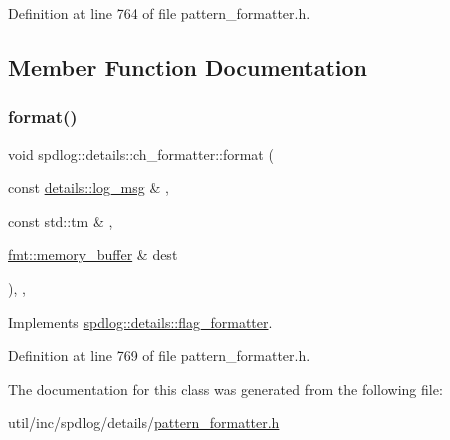 Definition at line 764 of file pattern\+\_\+formatter.\+h.



\subsection{Member Function Documentation}
\mbox{\label{classspdlog_1_1details_1_1ch__formatter_a11cf092c89041ff6186efb4324227cdb}} 
\subsubsection{\texorpdfstring{format()}{format()}}
{\footnotesize\ttfamily void spdlog\+::details\+::ch\+\_\+formatter\+::format (\begin{DoxyParamCaption}\item[{const \hyperlink{structspdlog_1_1details_1_1log__msg}{details\+::log\+\_\+msg} \&}]{,  }\item[{const std\+::tm \&}]{,  }\item[{\hyperlink{format_8h_a21cbf729f69302f578e6db21c5e9e0d2}{fmt\+::memory\+\_\+buffer} \&}]{dest }\end{DoxyParamCaption})\hspace{0.3cm}{\ttfamily [inline]}, {\ttfamily [override]}, {\ttfamily [virtual]}}



Implements \hyperlink{classspdlog_1_1details_1_1flag__formatter_a33fb3e42a4c8200cceb833d92b53fb67}{spdlog\+::details\+::flag\+\_\+formatter}.



Definition at line 769 of file pattern\+\_\+formatter.\+h.



The documentation for this class was generated from the following file\+:\begin{DoxyCompactItemize}
\item 
util/inc/spdlog/details/\hyperlink{pattern__formatter_8h}{pattern\+\_\+formatter.\+h}\end{DoxyCompactItemize}
